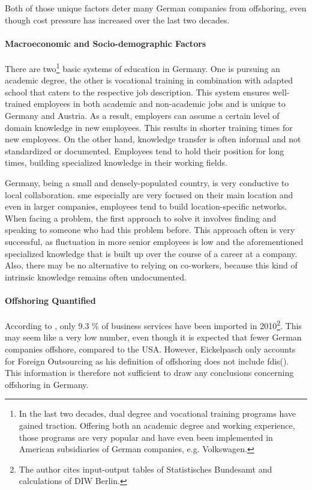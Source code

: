 Both of those unique factors deter many German companies from offshoring, even though cost pressure has increased over the last two decades.

\paragraph{Macroeconomic and Socio-demographic Factors}
There are two\footnote{In the last two decades, dual degree and vocational training programs have gained traction. Offering both an academic degree and working experience, those programs are very popular and have even been implemented in American subsidiaries of German companies, e.g. Volkswagen.} basic systems of education in Germany. One is pursuing an academic degree, the other is vocational training in combination with adapted school that caters to the respective job description. This system ensures well-trained employees in both academic and non-academic jobs and is unique to Germany and Austria. As a result, employers can assume a certain level of domain knowledge in new employees. This results in shorter training times for new employees. On the other hand, knowledge transfer is often informal and not standardized or documented. Employees tend to hold their position for long times, building specialized knowledge in their working fields. 

Germany, being a small and densely-populated country, is very conductive to local collaboration. \Gls{sme} especially are very focused on their main location and even in larger companies, employees tend to build location-specific networks. When facing a problem, the first approach to solve it involves finding and speaking to someone who had this problem before. This approach often is very successful, as fluctuation in more senior employees is low and the aforementioned specialized knowledge that is built up over the course of a career at a company. Also, there may be no alternative to relying on co-workers, because this kind of intrinsic knowledge remains often undocumented.


\paragraph{Offshoring Quantified}
According to \cite[p. 70]{Eickelpasch.2015}, only 9.3 \% of business services have been imported in 2010\footnote{The author cites input-output tables of  Statistisches Bundesamt and calculations of DIW Berlin.}. This may seem like a very low number, even though it is expected that fewer German companies offshore, compared to the USA. However, Eickelpasch only accounts for Foreign Outsourcing as his definition of offshoring does not include \glspl{fdi}(\cite[p. 56]{Eickelpasch.2015}). This information is therefore not sufficient to draw any conclusions concerning offshoring in Germany.

